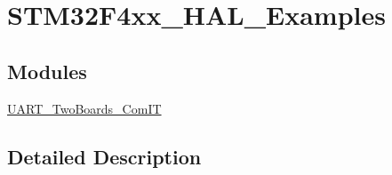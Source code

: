 \hypertarget{group__STM32F4xx__HAL__Examples}{\section{S\-T\-M32\-F4xx\-\_\-\-H\-A\-L\-\_\-\-Examples}
\label{group__STM32F4xx__HAL__Examples}
}
\subsection*{Modules}
\begin{DoxyCompactItemize}
\item 
\hyperlink{group__UART__TwoBoards__ComIT}{U\-A\-R\-T\-\_\-\-Two\-Boards\-\_\-\-Com\-I\-T}
\end{DoxyCompactItemize}


\subsection{Detailed Description}
